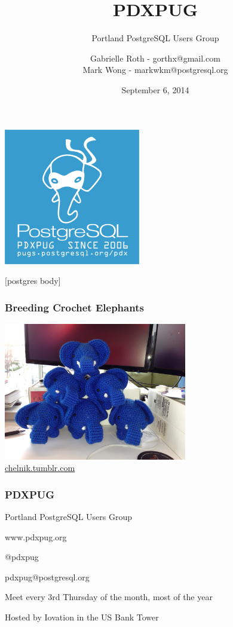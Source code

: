 \documentclass{beamer}
\title{PDXPUG}
\subtitle{Portland PostgreSQL Users Group}
\author[gorthx markwkm]{Gabrielle Roth - gorthx@gmail.com\\Mark Wong - markwkm@postgresql.org}
\date{September 6, 2014}
\begin{document}
\frame
{
  \begin{center}
  \includegraphics[scale=1]{pdxpug-logo.png}
  \end{center}
}

\frame{\titlepage}

[postgres body]


\frame
{
  \frametitle{Breeding Crochet Elephants}

  \begin{center}
  \includegraphics[width=8cm]{chelnik-pyramid.jpg}\\
  \url{chelnik.tumblr.com}
  \end{center}
}

\frame
{
  \frametitle{PDXPUG}

  Portland PostgreSQL Users Group

  www.pdxpug.org

  @pdxpug

  pdxpug@postgresql.org

  Meet every 3rd Thursday of the month, most of the year

  Hosted by Iovation in the US Bank Tower
}
\end{document}
